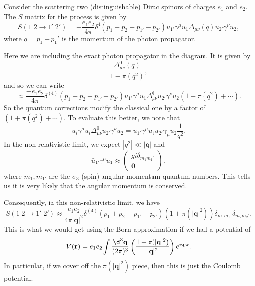 \documentclass[a4paper]{article}
\begin{document}
Consider the scattering two (distinguishable) Dirac spinors of charges $e_1$ and $e_2$. The $S$ matrix for the process is given by
\[
  S(1\; 2 \to 1'\;2') = - \frac{e_1e_2}{4\pi} \delta^4(p_1 + p_2 - p_{1'} - p_{2'})\bar{u}_{1'} \gamma^\mu u_1 \Delta_{\mu\nu}(q) \bar{u}_{2'} \gamma^\nu u_2,
\]
where $q = p_1 - p_1'$ is the momentum of the photon propagator.
\begin{center}
\end{center}
Here we are including the exact photon propagator in the diagram. It is given by
\[
  \frac{\Delta_{\mu\nu}^0(q)}{1 - \pi(q^2)},
\]
and so we can write
\[
  \approx \frac{-e_1 e_2}{4\pi} \delta^{(4)} (p_1 + p_2 - p_{1'} - p_{2'}) \bar{u}_{1'} \gamma^\mu u_1 \Delta_{\mu\nu}^0 \bar{u}_{2'} \gamma^\nu u_2 (1 + \pi(q^2) + \cdots).
\]
So the quantum corrections modify the classical one by a factor of $(1 + \pi(q^2) + \cdots)$. To evaluate this better, we note that
\[
  \bar{u}_i \gamma^\mu u_i \Delta_{\mu\nu}^0\bar{u}_{2'} \gamma^\nu u_2 = \bar{u}_{1'} \gamma^\mu u_1 \bar{u}_{2'} \gamma_\mu u_2 \frac{1}{q^2}.
\]
In the non-relativistic limit, we expect $|q^2| \ll |\mathbf{q}|$ and
\[
  \bar{u}_{1'}\gamma^\mu u_1 \approx
  \begin{pmatrix}
    gi \delta_{m_1 m_1'}\\
    \mathbf{0}
  \end{pmatrix},
\]
where $m_1, m_{1'}$ are the $\sigma_3$ (spin) angular momentum quantum numbers. This tells us it is very likely that the angular momentum is conserved.

Consequently, in this non-relativistic limit, we have
\[
  S(1\;2 \to 1'\; 2') \approx \frac{e_1 e_2}{4\pi |\mathbf{q}|^2} \delta^{(4)} (p_1 + p_2 - p_{1'} - p_{2'}) (1 + \pi (|\mathbf{q}|^2)) \delta_{m_1 m_1'} \delta_{m_2 m_2'}.
\]
This is what we would get using the Born approximation if we had a potential of
\[
  V(\mathbf{r}) = e_1 e_2 \int \frac{\d^3 \mathbf{q}}{(2\pi)^3} \left(\frac{1 + \pi(|\mathbf{q}|^2)}{ |\mathbf{q}|^2}\right) e^{i\mathbf{q}\cdot \mathbf{r}}.
\]
In particular, if we cover off the $\pi(|\mathbf{q}|^2)$ piece, then this is just the Coulomb potential.
\end{document}
